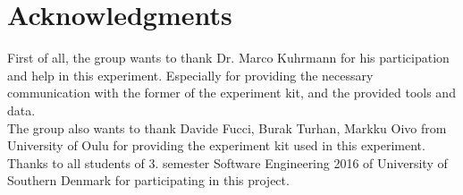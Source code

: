 \documentclass{sig-alternate-05-2015}
\begin{document}
\section{Acknowledgments}

First of all, the group wants to thank Dr. Marco Kuhrmann for his participation and help in this experiment. Especially for providing the necessary communication with the former of the experiment kit, and the provided tools and data.\\

The group also wants to thank Davide Fucci, Burak Turhan, Markku Oivo from University of Oulu for providing the experiment kit used in this experiment.\\

Thanks to all students of 3. semester Software Engineering 2016 of University of Southern Denmark for participating in this project.
\end{document}
